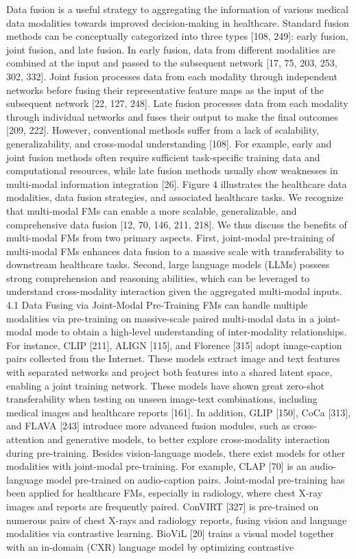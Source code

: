 \documentclass{article}%
\begin{document}
Data fusion is a useful strategy to aggregating the information of various medical data modalities towards improved decision{-}making in healthcare. Standard fusion methods can be conceptually categorized into three types {[}108, 249{]}: early fusion, joint fusion, and late fusion. In early fusion, data from different modalities are combined at the input and passed to the subsequent network {[}17, 75, 203, 253, 302, 332{]}. Joint fusion processes data from each modality through independent networks before fusing their representative feature maps as the input of the subsequent network {[}22, 127, 248{]}. Late fusion processes data from each modality through individual networks and fuses their output to make the final outcomes {[}209, 222{]}. However, conventional methods suffer from a lack of scalability, generalizability, and cross{-}modal understanding {[}108{]}. For example, early and joint fusion methods often require sufficient task{-}specific training data and computational resources, while late fusion methods usually show weaknesses in multi{-}modal information integration {[}26{]}. Figure 4 illustrates the healthcare data modalities, data fusion strategies, and associated healthcare tasks. We recognize that multi{-}modal FMs can enable a more scalable, generalizable, and comprehensive data fusion {[}12, 70, 146, 211, 218{]}. We thus discuss the benefits of multi{-}modal FMs from two primary aspects. First, joint{-}modal pre{-}training of multi{-}modal FMs enhances data fusion to a massive scale with transferability to downstream healthcare tasks. Second, large language models (LLMs) possess strong comprehension and reasoning abilities, which can be leveraged to understand cross{-}modality interaction given the aggregated multi{-}modal inputs. 4.1 Data Fusing via Joint{-}Modal Pre{-}Training FMs can handle multiple modalities via pre{-}training on massive{-}scale paired multi{-}modal data in a joint{-}modal mode to obtain a high{-}level understanding of inter{-}modality relationships. For instance, CLIP {[}211{]}, ALIGN {[}115{]}, and Florence {[}315{]} adopt image{-}caption pairs collected from the Internet. These models extract image and text features with separated networks and project both features into a shared latent space, enabling a joint training network. These models have shown great zero{-}shot transferability when testing on unseen image{-}text combinations, including medical images and healthcare reports {[}161{]}. In addition, GLIP {[}150{]}, CoCa {[}313{]}, and FLAVA {[}243{]} introduce more advanced fusion modules, such as cross{-}attention and generative models, to better explore cross{-}modality interaction during pre{-}training. Besides vision{-}language models, there exist models for other modalities with joint{-}modal pre{-}training. For example, CLAP {[}70{]} is an audio{-}language model pre{-}trained on audio{-}caption pairs. Joint{-}modal pre{-}training has been applied for healthcare FMs, especially in radiology, where chest X{-}ray images and reports are frequently paired. ConVIRT {[}327{]} is pre{-}trained on numerous pairs of chest X{-}rays and radiology reports, fusing vision and language modalities via contrastive learning. BioViL {[}20{]} trains a visual model together with an in{-}domain (CXR) language model by optimizing contrastive 
\end{document}
